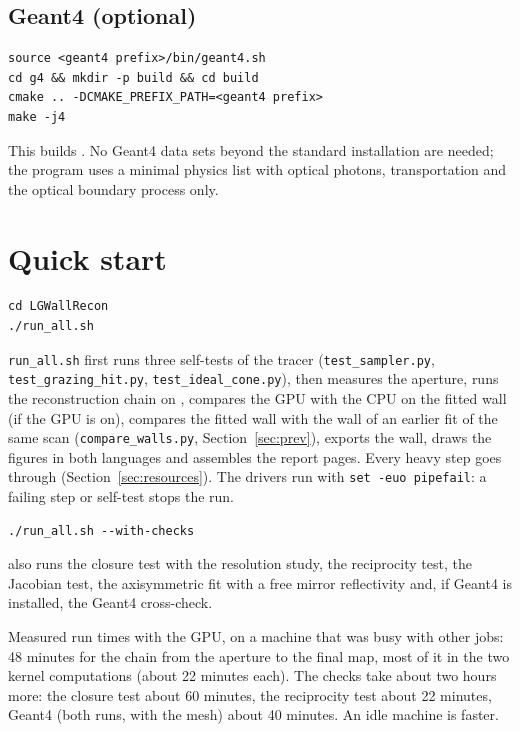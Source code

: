 \documentclass[11pt,a4paper]{article}
\newcommand{\code}[1]{\texttt{#1}}
\begin{document}
\subsection{Geant4 (optional)}

\begin{lstlisting}
source <geant4 prefix>/bin/geant4.sh
cd g4 && mkdir -p build && cd build
cmake .. -DCMAKE_PREFIX_PATH=<geant4 prefix>
make -j4
\end{lstlisting}
This builds . No Geant4 data sets beyond the standard installation are needed;
the program uses a minimal physics list with optical photons, transportation and the optical boundary
process only.

\section{Quick start}

\begin{lstlisting}
cd LGWallRecon
./run_all.sh
\end{lstlisting}

\code{run\_all.sh} first runs three self-tests of the tracer (\code{test\_sampler.py},
\code{test\_grazing\_hit.py}, \code{test\_ideal\_cone.py}), then measures the aperture, runs the
reconstruction chain on , compares the GPU with the CPU on the fitted
wall (if the GPU is on), compares the fitted wall with the wall of an earlier fit of the same scan
(\code{compare\_walls.py}, Section~\ref{sec:prev}), exports the wall, draws the figures in both
languages and assembles the report pages. Every heavy step goes through 
(Section~\ref{sec:resources}). The drivers run with \code{set -euo pipefail}: a failing step or
self-test stops the run.
\begin{lstlisting}
./run_all.sh --with-checks
\end{lstlisting}
also runs the closure test with the resolution study, the reciprocity test, the Jacobian test, the axisymmetric fit with
a free mirror reflectivity and, if Geant4 is installed, the Geant4 cross-check.

Measured run times with the GPU, on a machine that was busy with other jobs: 48 minutes for the
chain from the aperture to the final map, most of it in the two kernel computations (about 22 minutes
each). The checks take about two hours more: the closure test about 60 minutes, the reciprocity test
about 22 minutes, Geant4 (both runs, with the mesh) about 40 minutes. An idle machine is faster.
\end{document}

